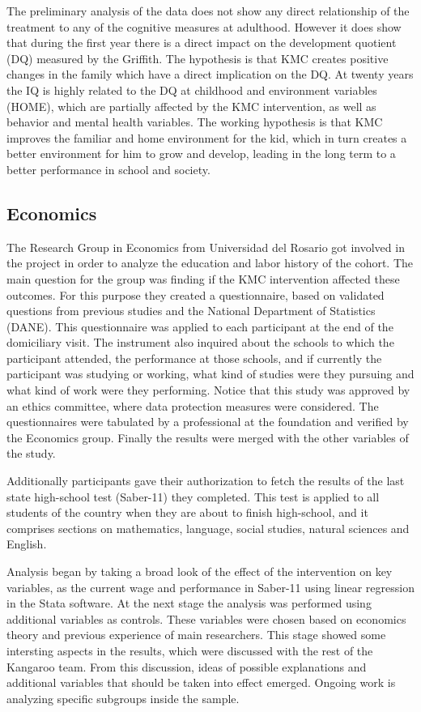 The preliminary analysis of the data does not show any direct relationship of the treatment to any of the cognitive measures at adulthood. However it does show that during the first year there is a direct impact on the development quotient (DQ) measured by the Griffith. The hypothesis is that KMC creates positive changes in the family which have a direct implication on the DQ. At twenty years the IQ is highly related to the DQ at childhood and  environment variables (HOME), which are partially affected by the KMC intervention, as well as behavior and mental health variables. The working hypothesis is that KMC improves the familiar and home environment for the kid, which in turn creates a better environment for him to grow and develop, leading in the long term to a better performance in school and society.

\subsection{Economics}

The Research Group in Economics from Universidad del Rosario got involved in the project in order to analyze the education and labor history of the cohort. The main question for the group was finding if the KMC intervention affected these outcomes. For this purpose they created a questionnaire, based on validated questions from previous studies and the National Department of Statistics (DANE). This questionnaire was applied to each participant at the end of the domiciliary visit. The instrument also inquired about the schools to which the participant attended, the performance at those schools, and if currently the participant was studying or working, what kind of studies were they pursuing and what kind of work were they performing. Notice that this study was approved by an ethics committee, where data protection measures were considered. The questionnaires were tabulated by a professional at the foundation and verified by the Economics group. Finally the results were merged with the other variables of the study.

Additionally participants gave their authorization to fetch the results of the last state high-school test (Saber-11) they completed. This test is applied to all students of the country when they are about to finish high-school, and it comprises sections on mathematics, language, social studies, natural sciences and English.

Analysis began by taking a broad look of the effect of the intervention on key variables, as the current wage and performance in Saber-11 using linear regression in the Stata software. At the next stage the analysis was performed using additional variables as controls. These variables were chosen based on economics theory and previous experience of main researchers. This stage showed some intersting aspects in the results, which were discussed with the rest of the Kangaroo team. From this discussion, ideas of possible explanations and additional variables that should be taken into effect emerged. Ongoing work is analyzing specific subgroups inside the sample. 

